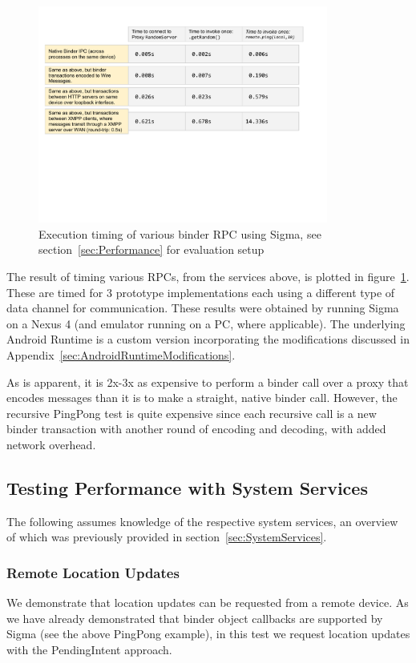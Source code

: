 \documentclass[prodmode]{acmlarge}
\begin{document}
\begin{figure}[h]
\centering
\includegraphics[width=0.85\textwidth]{drawings/Performance.pdf}
\caption{Execution timing of various binder RPC using Sigma, see section~\ref{sec:Performance} for evaluation setup}
\label{fig:performance}
\end{figure}

The result of timing various RPCs, from the services above, is plotted in figure~\ref{fig:performance}. These are timed for 3 prototype implementations each using a different type of data channel for communication. These results were obtained by running Sigma on a Nexus 4 (and emulator running on a PC, where applicable). The underlying Android Runtime is a custom version incorporating the modifications discussed in Appendix~\ref{sec:AndroidRuntimeModifications}.

As is apparent, it is 2x-3x as expensive to perform a binder call over a proxy that encodes messages than it is to make a straight, native binder call. However, the recursive PingPong test is quite expensive since each recursive call is a new binder transaction with another round of encoding and decoding, with added network overhead.

\subsection{Testing Performance with System Services}

The following assumes knowledge of the respective system services, an overview of which was previously provided in section~\ref{sec:SystemServices}.

\subsubsection{Remote Location Updates}
\label{sec:location_sharing}
We demonstrate that location updates can be requested from a remote device. As we have already demonstrated that binder object callbacks are supported by Sigma (see the above PingPong example), in this test we request location updates with the PendingIntent approach.
\end{document}
